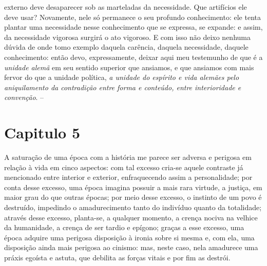 \begin{enumerate}
    externo deve desaparecer sob as marteladas da necessidade. Que
    artifícios ele deve usar? Novamente, nele só permanece o seu
    profundo conhecimento: ele tenta plantar uma necessidade nesse
    conhecimento que se expressa, se expande: e assim, da necessidade
    vigorosa surgirá o ato vigoroso. E com isso não deixo nenhuma dúvida
    de onde tomo exemplo daquela carência, daquela necessidade, daquele
    conhecimento: então devo, expressamente, deixar aqui meu testemunho
    de que é a \emph{unidade alemã} em seu sentido superior que
    ansiamos, e que ansiamos com mais fervor do que a unidade política,
    \emph{a unidade do espírito e vida alemães pelo aniquilamento da
    contradição entre forma e conteúdo, entre interioridade e
    convenção}. --
  \end{enumerate}

  \chapter{Capitulo 5}\label{capitulo-5}


A saturação de uma época com a história me parece ser adversa e perigosa
em relação à vida em cinco aspectos: com tal excesso cria-se aquele
contraste já mencionado entre interior e exterior, enfraquecendo assim a
personalidade; por conta desse excesso, uma época imagina possuir a mais
rara virtude, a justiça, em maior grau do que outras épocas; por meio
desse excesso, o instinto de um povo é destruído, impedindo o
amadurecimento tanto do indivíduo quanto da totalidade; através desse
excesso, planta-se, a qualquer momento, a crença nociva na velhice da
humanidade, a crença de ser tardio e epígono; graças a esse excesso, uma
época adquire uma perigosa disposição à ironia sobre si mesma e, com
ela, uma disposição ainda mais perigosa ao cinismo: mas, neste caso,
nela amadurece uma práxis egoísta e astuta, que debilita as forças
vitais e por fim as destrói.

